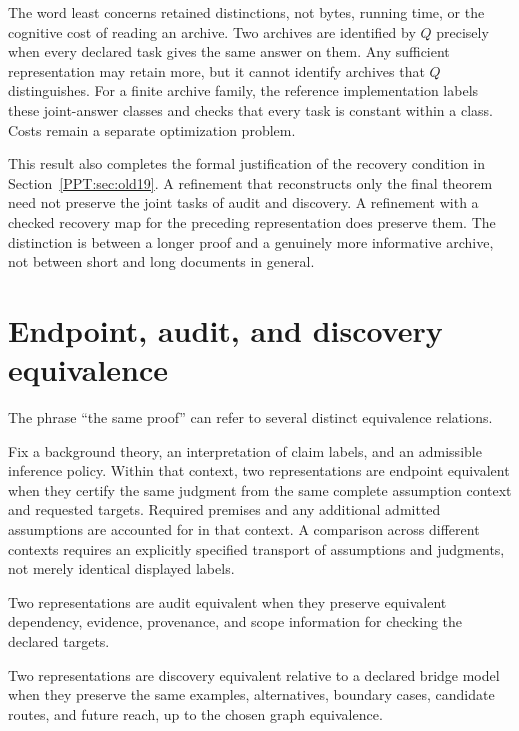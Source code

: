 The word least concerns retained distinctions, not bytes, running time, or the cognitive cost of reading an archive. Two archives are identified by $Q$ precisely when every declared task gives the same answer on them. Any sufficient representation may retain more, but it cannot identify archives that $Q$ distinguishes. For a finite archive family, the reference implementation labels these joint-answer classes and checks that every task is constant within a class. Costs remain a separate optimization problem.

This result also completes the formal justification of the recovery condition in Section~\ref{PPT:sec:old19}. A refinement that reconstructs only the final theorem need not preserve the joint tasks of audit and discovery. A refinement with a checked recovery map for the preceding representation does preserve them. The distinction is between a longer proof and a genuinely more informative archive, not between short and long documents in general.


\section{Endpoint, audit, and discovery equivalence}
\label{PPT:sec:old8}

The phrase ``the same proof'' can refer to several distinct equivalence relations.

\begin{PPTdefinition}
\label{PPT:res:8:1}
Fix a background theory, an interpretation of claim labels, and an admissible inference policy. Within that context, two representations are endpoint equivalent when they certify the same judgment from the same complete assumption context and requested targets. Required premises and any additional admitted assumptions are accounted for in that context. A comparison across different contexts requires an explicitly specified transport of assumptions and judgments, not merely identical displayed labels.
\end{PPTdefinition}

\begin{PPTdefinition}
\label{PPT:res:8:2}
Two representations are audit equivalent when they preserve equivalent dependency, evidence, provenance, and scope information for checking the declared targets.
\end{PPTdefinition}

\begin{PPTdefinition}
\label{PPT:res:8:3}
Two representations are discovery equivalent relative to a declared bridge model when they preserve the same examples, alternatives, boundary cases, candidate routes, and future reach, up to the chosen graph equivalence.
\end{PPTdefinition}

